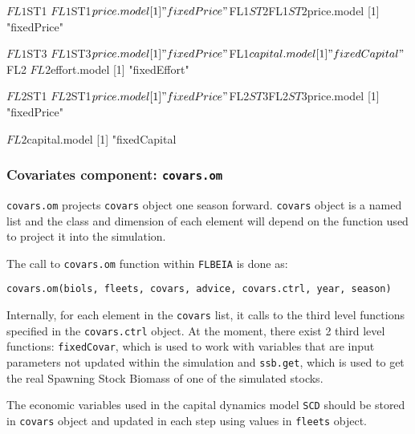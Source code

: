 \begin{description}
\begin{Schunk}
\begin{Soutput}
      $FL1$ST1
      $FL1$ST1$price.model
      [1] "fixedPrice"
      
      $FL1$ST2
      $FL1$ST2$price.model
      [1] "fixedPrice"
      
      $FL1$ST3
      $FL1$ST3$price.model
      [1] "fixedPrice"
      
      $FL1$capital.model
      [1] "fixedCapital"
       
      $FL2
      $FL2$effort.model
      [1] "fixedEffort"
      
      $FL2$ST1
      $FL2$ST1$price.model
      [1] "fixedPrice"
      
      $FL2$ST3
      $FL2$ST3$price.model
      [1] "fixedPrice"
      
      $FL2$capital.model
      [1] "fixedCapital
    \end{Soutput}
  \end{Schunk}
\end{description}

 
	\subsubsection{Covariates component: \texttt{covars.om}}
	
	\texttt{covars.om} projects \texttt{covars} object one season forward.  
	\texttt{covars} object is a named list and the class and dimension of each element will depend 
	on the function used to project it into the simulation. 
	
	\noindent The call to \texttt{covars.om} function within \texttt{FLBEIA} is done as:

  \begin{center}
    \texttt{covars.om(biols, fleets, covars, advice, covars.ctrl, year, season) }
  \end{center}

	Internally, for each element in the \texttt{covars} list, it calls to the third level functions
	specified in the \texttt{covars.ctrl} object. At the moment, there exist 2 third level functions: \texttt{fixedCovar}, 
	which is used to work with variables that are input parameters not updated within the simulation and \texttt{ssb.get}, 
  which is used to get the real Spawning Stock Biomass of one of the simulated stocks. 
	
	The economic variables used in the capital dynamics model \texttt{SCD} should be stored in 
\texttt{covars} object and updated in each step using values in \texttt{fleets} object.

